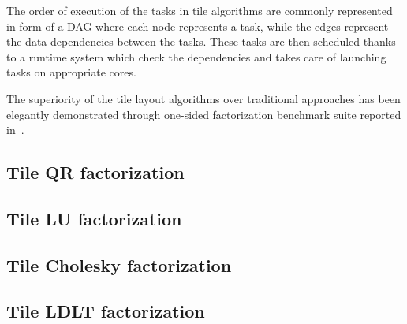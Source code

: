 The order of execution of the tasks in tile algorithms are commonly
represented in form of a DAG where each node represents a task, while
the edges represent the data dependencies between the tasks.  These
tasks are then scheduled thanks to a runtime system which check the
dependencies and takes care of launching tasks on appropriate cores.

The superiority of the tile layout algorithms over traditional
approaches has been elegantly demonstrated through one-sided
factorization benchmark suite reported
in~\cite{agullo2009comparative}.


\subsection{Tile QR factorization}

\subsection{Tile LU factorization}
\subsection{Tile Cholesky factorization}
\subsection{Tile LDLT factorization}
